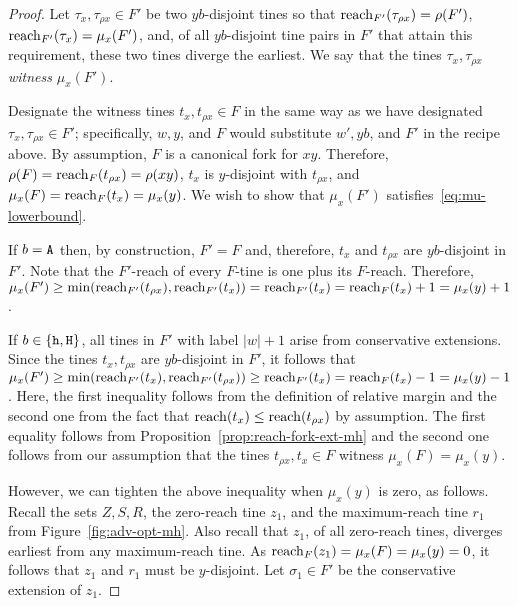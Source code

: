 \begin{proof}
  Let $\tau_x, \tau_{\rho x} \in F'$ be two $yb$-disjoint tines 
  so that 
  $\operatorname{reach}_{F'}(\tau_{\rho x}) = \rho(F')$, 
  $\operatorname{reach}_{F'}(\tau_x) = \mu_x(F')$, 
  and, of all $yb$-disjoint tine pairs in $F'$
  that attain this requirement, 
  these two tines diverge the earliest. 
  We say that the tines $\tau_x, \tau_{\rho x}$ \emph{witness} $\mu_x(F')$. 


  Designate the witness tines $t_x, t_{\rho x} \in F$ 
  in the same way as we have designated $\tau_x, \tau_{\rho x} \in F'$; 
  specifically, 
  $w, y$, and $F$ would substitute $w', yb$, and $F'$ 
  in the recipe above. 
  By assumption, $F$ is a canonical fork for $xy$. 
  Therefore, 
  $\rho(F) = \operatorname{reach}_F(t_{\rho x}) = \rho(xy)$, 
  $t_x$ is $y$-disjoint with $t_{\rho x}$, 
  and 
  $\mu_x(F) = \operatorname{reach}_F(t_x) = \mu_x(y)$. 
  We wish to show that 
  $\mu_x(F')$ satisfies~\eqref{eq:mu-lowerbound}. 

  If $b = \mathtt{A}$ then, by construction,
  $F' = F$ and, therefore,
  $t_x$ and $t_{\rho x}$ are $yb$-disjoint in $F'$.
  Note that the $F'$-reach of every $F$-tine is one plus its $F$-reach. 
  Therefore, 
  $
  \mu_x(F') 
  \geq \min(\operatorname{reach}_{F'}(t_{\rho x}), \operatorname{reach}_{F'}(t_x))
  = \operatorname{reach}_{F'}(t_x)
  = \operatorname{reach}_F(t_x) + 1
  = \mu_x(y) + 1
  $. 


  If $b \in \{\mathtt{h}, \mathtt{H}\}$, 
  all tines in $F'$ with label $|w| + 1$ arise from conservative extensions. 
  Since the tines $t_x, t_{\rho x}$ are $yb$-disjoint in $F'$, 
  it follows that $\mu_x(F') \geq \min(\operatorname{reach}_{F'}(t_x), \operatorname{reach}_{F'}(t_{\rho x})) \geq \operatorname{reach}_{F'}(t_x) = \operatorname{reach}_{F}(t_x) - 1 = \mu_x(y) - 1$. 
  Here, the first inequality follows from the definition of relative margin and 
  the second one from the fact that $\operatorname{reach}(t_x) \leq \operatorname{reach}(t_{\rho x})$ by assumption. 
  The first equality follows from Proposition~\ref{prop:reach-fork-ext-mh} and 
  the second one follows from our assumption that the tines $t_{\rho x}, t_x\in F$ witness $\mu_x(F) = \mu_x(y)$. 

  However, we can tighten the above inequality when $\mu_x(y)$ is zero, as follows. 
  Recall the sets $Z, S, R$, 
  the zero-reach tine $z_1$, 
  and the maximum-reach tine $r_1$ 
  from Figure~\ref{fig:adv-opt-mh}. 
  Also recall that $z_1$, of all zero-reach tines, 
  diverges earliest from any maximum-reach tine.
  As $\operatorname{reach}_F(z_1) = \mu_x(F) = \mu_x(y) = 0$, 
  it follows that 
  $z_1$ and $r_1$ must be $y$-disjoint.
  Let $\sigma_1 \in F'$ be the conservative extension of $z_1$.



\end{proof}
